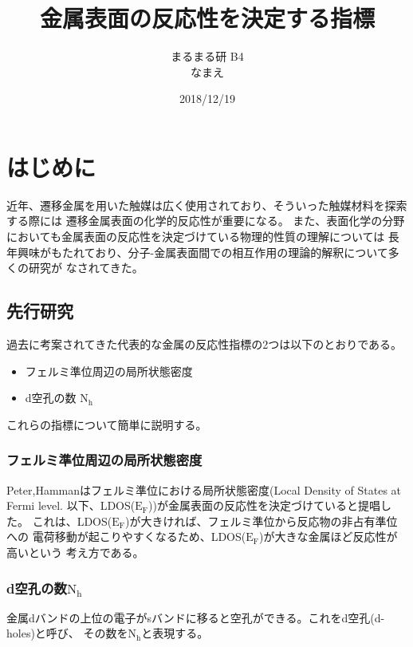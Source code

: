 \documentclass[12pt]{ltjsarticle}
\begin{document}
\begin{titlepage}
\title{金属表面の反応性を決定する指標}
\author{まるまる研 B4 \\ なまえ}
\date{2018/12/19}
\maketitle
\tableofcontents

\end{titlepage}

\section{はじめに}
近年、遷移金属を用いた触媒は広く使用されており、そういった触媒材料を探索する際には
遷移金属表面の化学的反応性が重要になる。
また、表面化学の分野においても金属表面の反応性を決定づけている物理的性質の理解については
長年興味がもたれており、分子-金属表面間での相互作用の理論的解釈について多くの研究が
なされてきた。 \\

\subsection{先行研究}

過去に考案されてきた代表的な金属の反応性指標の2つは以下のとおりである。

\begin{itemize}
 \item フェルミ準位周辺の局所状態密度
 \item d空孔の数 $\text{N}_\text{h}$
\end{itemize}

これらの指標について簡単に説明する。

\subsubsection{フェルミ準位周辺の局所状態密度}
Peter,Hammanはフェルミ準位における局所状態密度(Local Density of States at Fermi level.
以下、LDOS($\text{E}_\text{F}$))が金属表面の反応性を決定づけていると提唱した。
これは、LDOS($\text{E}_\text{F}$)が大きければ、フェルミ準位から反応物の非占有準位への
電荷移動が起こりやすくなるため、LDOS($\text{E}_\text{F}$)が大きな金属ほど反応性が高いという
考え方である。\cite{PeterJ.Feibelman1984}

\subsubsection{d空孔の数$\text{N}_\text{h}$}
金属dバンドの上位の電子がsバンドに移ると空孔ができる。これをd空孔(d-holes)と呼び、
その数を$\text{N}_\text{h}$と表現する。
\end{document}

